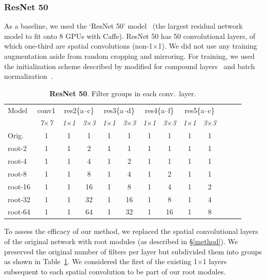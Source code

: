 \documentclass[thesis]{subfiles}
\begin{document}
	\subsubsection{ResNet 50}
	\label{resnet50results}
	As a baseline, we used the `ResNet 50' model~\citep{He2015} (the largest residual network model to fit onto 8 GPUs with Caffe). ResNet 50 has 50 convolutional layers, of which one-third are spatial convolutions (non-1$\times$1). We did not use any training augmentation aside from random cropping and mirroring. 
	For training, we used the initialization scheme described by \citep{He2015b} modified for compound layers~\citep{Ioannou2016} and batch normalization~\citep{Ioffe2015}.
	\begin{table}[tp]
		\caption{\textbf{ResNet 50}. Filter groups in each conv.\ layer.}
		\label{table:resnet50config}
		\centering
		\begin{tabular}{@{}lcccccccccccc@{}}
			\toprule
			Model & conv1 & \multicolumn{2}{c}{res2\{a--c\}} & \multicolumn{2}{c}{res3\{a--d\}} & \multicolumn{2}{c}{res4\{a--f\}} & \multicolumn{2}{c}{res5\{a--c\}} \\
			& \textit{\footnotesize7$\times$7} & \textit{\footnotesize1$\times$1} & \textit{\footnotesize3$\times$3} & \textit{\footnotesize1$\times$1} & \textit{\footnotesize3$\times$3} & \textit{\footnotesize1$\times$1} & \textit{\footnotesize3$\times$3} & \textit{\footnotesize1$\times$1} & \textit{\footnotesize3$\times$3} \\
			Orig. & 1 & 1 & 1 & 1 &  1 & 1 &  1 & 1 & 1 \\
			\midrule
			root-2 & 1 & 1 & 2 & 1 &  1 & 1 &  1 & 1 & 1 \\
			root-4 & 1 & 1 & 4 & 1 &  2 & 1 &  1 & 1 & 1 \\
			root-8 & 1 & 1 & 8 & 1 &  4 & 1 &  2 & 1 & 1 \\
			root-16 & 1 & 1 & 16 & 1 &  8 & 1 &  4 & 1 & 2 \\
			root-32 & 1 & 1 & 32 & 1 & 16 & 1 &  8 & 1 & 4 \\
			root-64 & 1 & 1 & 64 & 1 & 32 & 1 & 16 & 1 & 8 \\
			\bottomrule
		\end{tabular}
	\end{table}
	To assess the efficacy of our method, we replaced the spatial convolutional layers of the original network with root modules (as described in \S\ref{method}). We preserved the original number of filters per layer but subdivided them into groups as shown in Table~\ref{table:resnet50config}. We considered the first of the existing 1$\times$1 layers subsequent to each spatial convolution to be part of our root modules. 
\end{document}
